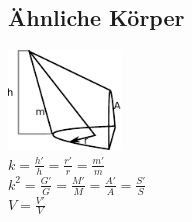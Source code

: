 \documentclass[10pt,a4paper]{article}
\begin{document}
\begin{multicols}{4}
		\section{Ähnliche Körper}
		\includegraphics[width=3cm]{imgs/similar}\\
		\( k = \frac{h'}{h} = \frac{r'}{r} = \frac{m'}{m} \)\\
		\( k^2 = \frac{G'}{G} = \frac{M'}{M} = \frac{A'}{A} = \frac{S'}{S} \)\\
		\( V = \frac{V'}{V} \)
	\end{multicols}
\end{document}

